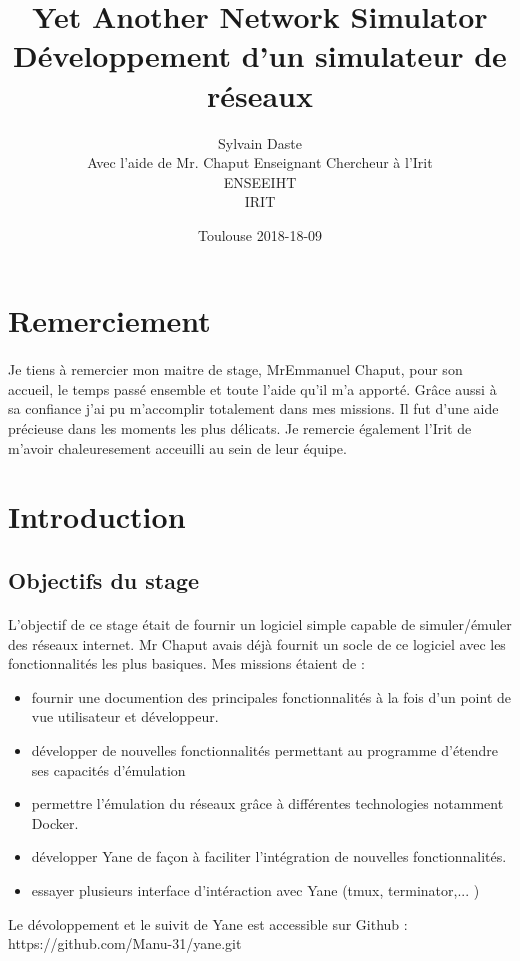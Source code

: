\documentclass{article}
\begin{document}
	\title{Yet Another Network Simulator\\Développement d'un simulateur de réseaux}
	\date{Toulouse 2018-18-09}
	\author{Sylvain Daste\\Avec l'aide de Mr. Chaput Enseignant Chercheur à l'Irit\\ENSEEIHT\\IRIT}
	\maketitle



  	\newpage
	\tableofcontents
  	\newpage
	
	
	\section{Remerciement}
\paragraph{}
Je tiens à remercier mon maitre de stage, MrEmmanuel Chaput, pour son accueil, le temps passé ensemble et toute l'aide qu'il m'a apporté. Grâce aussi à sa confiance j'ai pu m'accomplir totalement dans mes missions. Il fut d'une aide précieuse dans les moments les plus délicats. Je remercie également l'Irit de m'avoir chaleuresement acceuilli au sein de leur équipe.
	\newpage
	
	
	
	
	
	\section{Introduction}
	\subsection{Objectifs du stage}
\paragraph{}
L'objectif de ce stage était de fournir un logiciel simple capable de simuler/émuler des réseaux internet. Mr Chaput avais déjà fournit un socle de ce logiciel avec les fonctionnalités les plus basiques. Mes missions étaient de :
		\begin{itemize}
			\item fournir une documention des principales fonctionnalités à la fois d'un point de vue utilisateur et développeur.
			\item développer de nouvelles fonctionnalités permettant au programme d'étendre ses capacités d'émulation
			\item permettre l'émulation du réseaux grâce à différentes technologies notamment Docker.
			\item développer Yane de façon à faciliter l'intégration de nouvelles fonctionnalités.
			\item essayer plusieurs interface d'intéraction avec Yane (tmux, terminator,... )
		\end{itemize}
Le dévoloppement et le suivit de Yane est accessible sur Github : https://github.com/Manu-31/yane.git
\end{document}
